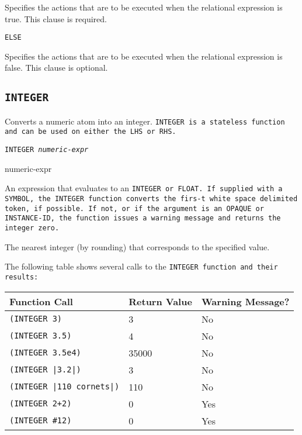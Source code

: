 Specifies the actions that are to be executed when the
relational expression is true. This clause is required.

\tt{ELSE}

Specifies the actions that are to be executed when the
relational expression is false. This clause is optional.

\subsection{\tt{INTEGER}}

Converts a numeric atom into an integer. \tt{INTEGER} is a stateless
function and can be used on either the LHS or RHS.

\Format

\tt{INTEGER} \it{numeric-expr}

\begin{arguments}
\item[numeric-expr]

  An expression that evaluates to an \tt{INTEGER} or \tt{FLOAT}. If
  supplied with a \tt{SYMBOL}, the \tt{INTEGER} function converts the
  firs-t white space delimited token, if possible. If not, or if the
  argument is an \tt{OPAQUE} or \tt{INSTANCE-ID}, the function issues
  a warning message and returns the integer zero.
\end{arguments}

\ReturnValue

The nearest integer (by rounding) that corresponds to the
specified value.

\Example

The following table shows several calls to the \tt{INTEGER}
function and their results:

\begin{center}
  \begin{tabular}{lll}
    \toprule
    Function Call & Return Value &  Warning Message? \\
    \midrule
    \verb|(INTEGER 3)| &  3 & No \\
    \verb|(INTEGER 3.5)| &  4  & No \\
    \verb|(INTEGER 3.5e4)| &  35000 & No \\
    \verb,(INTEGER |3.2|), &  3 & No \\
    \verb,(INTEGER |110 cornets|), & 110 & No \\
    \verb|(INTEGER 2+2)| &  0 & Yes \\
    \verb|(INTEGER #12)| &  0 & Yes \\
    \bottomrule
  \end{tabular}
\end{center}

